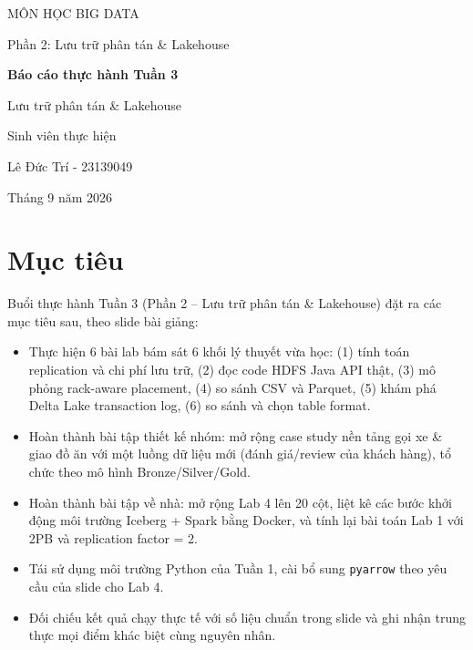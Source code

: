 \documentclass[12pt,a4paper,oneside]{article}
\begin{document}
\begin{titlepage}
\centering
{\large MÔN HỌC BIG DATA\par}
\vspace{0.4cm}
{\large Phần 2: Lưu trữ phân tán \& Lakehouse\par}
\vspace{3cm}
{\LARGE\bfseries Báo cáo thực hành Tuần 3\par}
\vspace{0.6cm}
{\Large Lưu trữ phân tán \& Lakehouse\par}
\vspace{3cm}
{\large Sinh viên thực hiện\par}
{\large Lê Đức Trí - 23139049 \par}
\vfill
{\large Tháng 9 năm 2026\par}
\end{titlepage}

\tableofcontents
\newpage

\section{Mục tiêu}

Buổi thực hành Tuần 3 (Phần 2 -- Lưu trữ phân tán \& Lakehouse) đặt ra các mục tiêu sau, theo slide bài giảng:

\begin{itemize}
  \item Thực hiện 6 bài lab bám sát 6 khối lý thuyết vừa học: (1) tính toán replication và chi phí lưu trữ, (2) đọc code HDFS Java API thật, (3) mô phỏng rack-aware placement, (4) so sánh CSV và Parquet, (5) khám phá Delta Lake transaction log, (6) so sánh và chọn table format.
  \item Hoàn thành bài tập thiết kế nhóm: mở rộng case study nền tảng gọi xe \& giao đồ ăn với một luồng dữ liệu mới (đánh giá/review của khách hàng), tổ chức theo mô hình Bronze/Silver/Gold.
  \item Hoàn thành bài tập về nhà: mở rộng Lab 4 lên 20 cột, liệt kê các bước khởi động môi trường Iceberg + Spark bằng Docker, và tính lại bài toán Lab 1 với 2PB và replication factor = 2.
  \item Tái sử dụng môi trường Python của Tuần 1, cài bổ sung \texttt{pyarrow} theo yêu cầu của slide cho Lab 4.
  \item Đối chiếu kết quả chạy thực tế với số liệu chuẩn trong slide và ghi nhận trung thực mọi điểm khác biệt cùng nguyên nhân.
\end{itemize}
\end{document}
